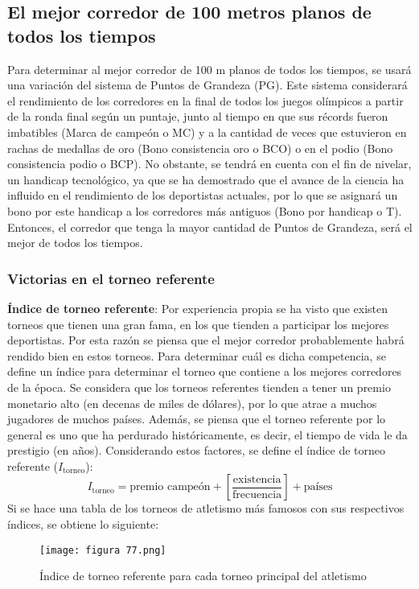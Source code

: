 \documentclass[a4paper]{article}
\begin{document}
\subsection{El mejor corredor de 100 metros planos de todos los tiempos}
Para determinar al mejor corredor de 100 m planos de todos los tiempos, se usará una variación del sistema de Puntos de Grandeza (PG). Este sistema considerará el rendimiento de los corredores en la final de todos los juegos olímpicos a partir de la ronda final según un puntaje, junto al tiempo en que sus récords fueron imbatibles (Marca de campeón o MC) y a la cantidad de veces que estuvieron en rachas de medallas de oro (Bono consistencia oro o BCO) o en el podio (Bono consistencia podio o BCP). 
 \newline\newline No obstante, se tendrá en cuenta con el fin de nivelar, un handicap tecnológico, ya que se ha demostrado que el avance de la ciencia ha influido en el rendimiento de los deportistas actuales, por lo que se asignará un bono por este handicap a los corredores más antiguos (Bono por handicap o T). Entonces, el corredor que tenga la mayor cantidad de Puntos de Grandeza, será el mejor de todos los tiempos. \subsubsection{Victorias en el torneo referente} 
\textbf{Índice de torneo referente}:
Por experiencia propia se ha visto que existen torneos que tienen una gran fama, en los que tienden a participar los mejores deportistas. Por esta razón se piensa que el mejor corredor probablemente habrá rendido bien en estos torneos. Para determinar cuál es dicha competencia, se define un índice para determinar el torneo que contiene a los mejores corredores de la época. Se considera que los torneos referentes tienden a tener un premio monetario alto (en decenas de miles de dólares), por lo que atrae a muchos jugadores de muchos países. Además, se piensa que el torneo referente por lo general es uno que ha perdurado históricamente, es decir, el tiempo de vida le da prestigio (en años). Considerando estos factores, se define el índice de torneo referente ($I_{\text{torneo}}$): 
\begin{equation*}
    I_{\text{torneo}} = \text{premio campeón} + \left[\frac{\text{existencia}}{\text{frecuencia}}\right] + \text{países}
\end{equation*}
Si se hace una tabla de los torneos de atletismo más famosos con sus respectivos índices, se obtiene lo siguiente:
\begin{figure}[H]
    \begin{center}
    \texttt{[image: figura 77.png]}    
    \end{center}    
    \caption{Índice de torneo referente para cada torneo principal del atletismo}
\end{figure}
\end{document}
